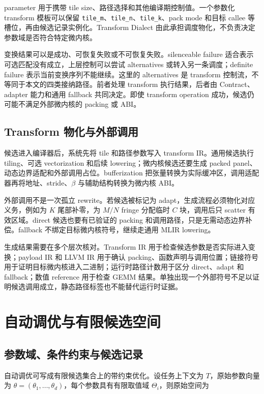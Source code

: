parameter 用于携带 tile size、路径选择和其他编译期控制值。一个参数化 transform 模板可以保留 \texttt{tile\_m}、\texttt{tile\_n}、\texttt{tile\_k}、pack mode 和目标 callee 等槽位，再由候选记录实例化。Transform Dialect 由此承担调度物化，不负责决定参数域是否符合特定微内核。

变换结果可以是成功、可恢复失败或不可恢复失败。silenceable failure 适合表示可选匹配没有成立，上层控制可以尝试 alternatives 或转入另一条调度；definite failure 表示当前变换序列不能继续。这里的 alternatives 是 transform 控制流，不等同于本文的四类接纳路径。前者处理 transform 执行结果，后者由 Contract、adapter 能力和通用 fallback 共同决定。即使 transform operation 成功，候选仍可能不满足外部微内核的 packing 或 ABI。

\subsection{Transform 物化与外部调用}

候选进入编译器后，系统先将 tile 和路径参数写入 transform IR。通用候选执行 tiling、可选 vectorization 和后续 lowering；微内核候选还要生成 packed panel、动态边界适配和外部调用占位。bufferization 把张量转换为实际缓冲区，调用适配器再将地址、stride、$\beta$ 与辅助结构转换为微内核 ABI。

外部调用不是一次孤立 rewrite。若候选被标记为 adapt，生成流程必须物化对应义务，例如为 $K$ 尾部补零，为 $M/N$ fringe 分配临时 $C$ 块，调用后只 scatter 有效区域。direct 候选也要有已验证的 packing 和调用路径，只是无需动态边界补偿。fallback 不绑定目标微内核符号，继续走通用 MLIR lowering。

生成结果需要在多个层次核对。Transform IR 用于检查候选参数是否实际进入变换；payload IR 和 LLVM IR 用于确认 packing、函数声明与调用位置；链接符号用于证明目标微内核进入二进制；运行时路径计数用于区分 direct、adapt 和 fallback；数值 reference 用于检查 GEMM 结果。单独出现一个外部符号不足以证明候选调用成立，静态路径标签也不能替代运行时证据。

\section{自动调优与有限候选空间}

\subsection{参数域、条件约束与候选记录}

自动调优可写成有限候选集合上的带约束优化。设任务上下文为 $T$，原始参数向量为 $\theta=(\theta_1,\ldots,\theta_d)$，每个参数具有有限取值域 $\Theta_i$，则原始空间为

